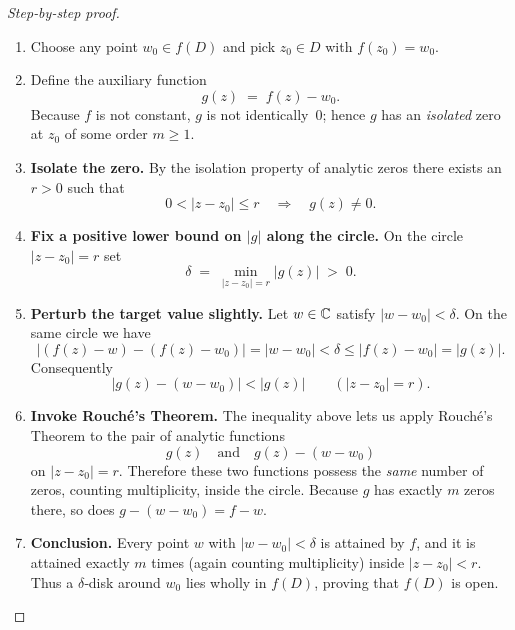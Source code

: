 \documentclass[12pt]{article}
\theoremstyle{definition} %
\theoremstyle{plain} %
\begin{document}
\begin{proof}[Step‑by‑step proof]
\begin{enumerate}
  \item Choose any point $w_0\in f(D)$ and pick $z_0\in D$ with $f(z_0)=w_0$.

  \item Define the auxiliary function
        \[
            g(z)\;=\;f(z)-w_0 .
        \]
        Because $f$ is not constant, $g$ is not identically~$0$; hence
        $g$ has an \emph{isolated} zero at $z_0$ of some order $m\ge 1$.

  \item \textbf{Isolate the zero.}  
        By the isolation property of analytic zeros there exists
        an $r>0$ such that
        \[
             0<|z-z_0|\le r\quad\Longrightarrow\quad g(z)\neq 0 .
        \]

  \item \textbf{Fix a positive lower bound on $|g|$ along the circle.}  
        On the circle $|z-z_0|=r$ set
        \[
             \delta\;=\;\min_{|z-z_0|=r}\bigl|g(z)\bigr| \;>\;0 .
        \]

  \item \textbf{Perturb the target value slightly.}  
        Let $w\in\Bbb C$ satisfy $|w-w_0|<\delta$.  
        On the same circle we have
        \[
          \bigl|(f(z)-w)-(f(z)-w_0)\bigr|
          =|w-w_0|
          <\delta
          \le |f(z)-w_0|
          =|g(z)|.
        \]
        Consequently
        \[
             |g(z)-(w-w_0)|<|g(z)|
             \qquad (|z-z_0|=r).
        \]

  \item \textbf{Invoke Rouch\'e's Theorem.}  
        The inequality above lets us apply Rouch\'e’s Theorem to the
        pair of analytic functions
        \[
             g(z)\quad\text{and}\quad g(z)-(w-w_0)
        \]
        on $|z-z_0|=r$.  
        Therefore these two functions possess the \emph{same} number of zeros,
        counting multiplicity, inside the circle.  
        Because $g$ has exactly $m$ zeros there, so does
        $g-(w-w_0)=f-w$.

  \item \textbf{Conclusion.}  
        Every point $w$ with $|w-w_0|<\delta$ is attained by $f$,
        and it is attained exactly $m$ times (again counting multiplicity)
        inside $|z-z_0|<r$.  Thus a $\delta$‑disk around $w_0$
        lies wholly in $f(D)$, proving that $f(D)$ is open.
\end{enumerate}
\end{proof}
\end{document}
